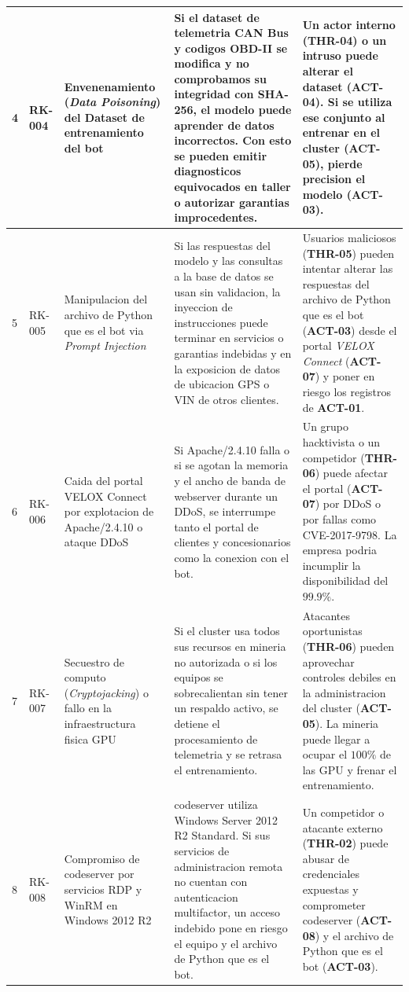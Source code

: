 \documentclass[letterpaper,11pt]{article}
\begin{document}
\begin{longtable}{|C{0.6cm}|C{1.3cm}|L{2.8cm}|L{5.8cm}|L{5.8cm}|}
4
  & RK-004
  & Envenenamiento (\textit{Data Poisoning}) del Dataset de
entrenamiento del bot
  & Si el dataset de telemetria CAN Bus y codigos OBD-II se modifica y
no comprobamos su integridad con SHA-256, el modelo puede aprender
de datos incorrectos. Con esto se pueden emitir diagnosticos
equivocados en taller o autorizar garantias improcedentes.
  & Un actor interno (\textbf{THR-04}) o un intruso puede alterar el
dataset (\textbf{ACT-04}). Si se utiliza ese conjunto al entrenar
en el cluster (\textbf{ACT-05}), pierde precision el modelo
(\textbf{ACT-03}). \\
\hline

5
  & RK-005
  & Manipulacion del archivo de Python que es el bot via \textit{Prompt
Injection}
  & Si las respuestas del modelo y las consultas a la base de datos se
usan sin validacion, la inyeccion de instrucciones puede terminar
en servicios o garantias indebidas y en la exposicion de datos de
ubicacion GPS o VIN de otros clientes.
  & Usuarios maliciosos (\textbf{THR-05}) pueden intentar alterar las
respuestas del archivo de Python que es el bot (\textbf{ACT-03})
desde el portal \textit{VELOX Connect} (\textbf{ACT-07}) y poner en
riesgo los registros de \textbf{ACT-01}. \\
\hline

6
  & RK-006
  & Caida del portal VELOX Connect por explotacion de Apache/2.4.10 o
ataque DDoS
  & Si Apache/2.4.10 falla o si se agotan la memoria y el ancho de
banda de webserver durante un DDoS, se interrumpe tanto el portal
de clientes y concesionarios como la conexion con el bot.
  & Un grupo hacktivista o un competidor (\textbf{THR-06}) puede
afectar el portal (\textbf{ACT-07}) por DDoS o por fallas como
CVE-2017-9798. La empresa podria incumplir la disponibilidad del
$99.9\%$. \\
\hline

7
  & RK-007
  & Secuestro de computo (\textit{Cryptojacking}) o fallo en la
infraestructura fisica GPU
  & Si el cluster usa todos sus recursos en mineria no autorizada o si
los equipos se sobrecalientan sin tener un respaldo activo, se
detiene el procesamiento de telemetria y se retrasa el
entrenamiento.
  & Atacantes oportunistas (\textbf{THR-06}) pueden aprovechar
controles debiles en la administracion del cluster
(\textbf{ACT-05}). La mineria puede llegar a ocupar el $100\%$ de
las GPU y frenar el entrenamiento. \\
\hline

8
  & RK-008
  & Compromiso de codeserver por servicios RDP y WinRM en Windows 2012
R2
  & codeserver utiliza Windows Server 2012 R2 Standard. Si sus
servicios de administracion remota no cuentan con autenticacion
multifactor, un acceso indebido pone en riesgo el equipo y el
archivo de Python que es el bot.
  & Un competidor o atacante externo (\textbf{THR-02}) puede abusar de
credenciales expuestas y comprometer codeserver (\textbf{ACT-08}) y
el archivo de Python que es el bot (\textbf{ACT-03}). \\
\hline


\end{longtable}
\end{document}
